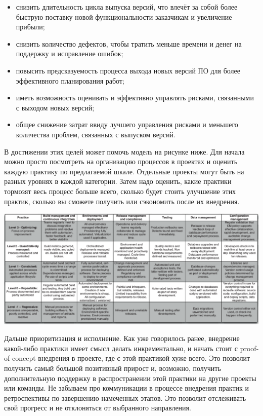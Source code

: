 \documentclass{../../text-style}
\begin{document}
\begin{itemize}
    \item снизить длительность цикла выпуска версий, что влечёт за собой более быструю поставку новой функциональности заказчикам и увеличение прибыли;
    \item снизить количество дефектов, чтобы тратить меньше времени и денег на поддержку и исправление ошибок;
    \item повысить предсказуемость процесса выхода новых версий ПО для более эффективного планирования работ;
    \item иметь возможность оценивать и эффективно управлять рисками, связанными с выходом новых версий;
    \item общее снижение затрат ввиду лучшего управления рисками и меньшего количества проблем, связанных с выпуском версий.
\end{itemize}

В достижении этих целей может помочь модель на рисунке ниже. Для начала можно просто посмотреть на организацию процессов в проектах и оценить каждую практику по предлагаемой шкале. Отдельные проекты могут быть на разных уровнях в каждой категории. Затем надо оценить, какие практики тормозят весь процесс больше всего, сколько будет стоить улучшение этих практик, сколько вы сможете получить или сэкономить после их внедрения. 

\begin{center}
    \includegraphics[width=\textwidth]{cdMaturityModel.png}
\end{center}

Дальше приоритизация и исполнение. Как уже говорилось ранее, внедрение какой-либо практики имеет смысл делать инкрементально, и начать стоит с proof-of-concept внедрения в проекте, где с этой практикой хуже всего. Это позволит получить самый большой позитивный прирост и, возможно, получить дополнительную поддержку в распространении этой практики на другие проекты или команды. Не забываем про коммуникации в процессе внедрения практик и ретроспективы по завершению намеченных этапов. Это позволит отслеживать свой прогресс и не отклоняться от выбранного направления.
\end{document}
